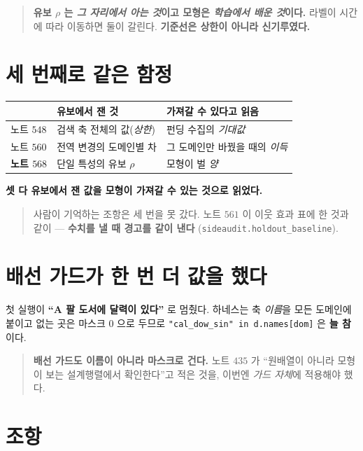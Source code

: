 \documentclass[11pt]{article}
\begin{document}
\begin{quote}
\textbf{유보 $\rho$ 는 \emph{그 자리에서 아는 것}이고 모형은 \emph{학습에서
배운 것}이다.} 라벨이 시간에 따라 이동하면 둘이 갈린다. \textbf{기준선은
상한이 아니라 신기루였다.}
\end{quote}

\section{세 번째로 같은 함정}

\begin{center}
\begin{tabular}{lll}
\hline
 & 유보에서 잰 것 & 가져갈 수 있다고 읽음 \\
\hline
노트 $548$ & 검색 축 전체의 값(\emph{상한}) & 펀딩 수집의 \emph{기대값} \\
노트 $560$ & 전역 변경의 도메인별 차 & 그 도메인만 바꿨을 때의 \emph{이득} \\
\textbf{노트 $568$} & 단일 특성의 유보 $\rho$ & 모형이 벌 \emph{양} \\
\hline
\end{tabular}
\end{center}

\textbf{셋 다 유보에서 잰 값을 모형이 가져갈 수 있는 것으로 읽었다.}

\begin{quote}
사람이 기억하는 조항은 세 번을 못 갔다. 노트 $561$ 이 이웃 효과 표에 한
것과 같이 --- \textbf{수치를 낼 때 경고를 같이 낸다}
(\texttt{sideaudit.holdout\_baseline}).
\end{quote}

\section*{배선 가드가 한 번 더 값을 했다}

첫 실행이 \textbf{``A 팔 도서에 달력이 있다''} 로 멈췄다. 하네스는 축
\emph{이름}을 모든 도메인에 붙이고 없는 곳은 마스크 $0$ 으로 두므로
\texttt{"cal\_dow\_sin" in d.names[dom]} 은 \textbf{늘 참}이다.

\begin{quote}
\textbf{배선 가드도 이름이 아니라 마스크로 건다.} 노트 $435$ 가 ``원배열이
아니라 모형이 보는 설계행렬에서 확인한다''고 적은 것을, 이번엔 \emph{가드
자체}에 적용해야 했다.
\end{quote}

\section*{조항}
\end{document}
